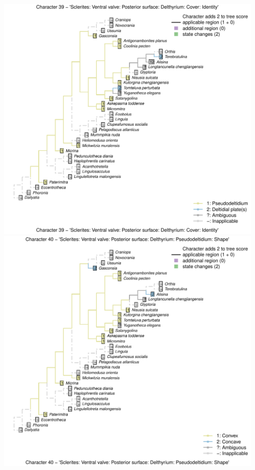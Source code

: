 \documentclass[]{book}
\theoremstyle{definition}
\theoremstyle{definition}
\theoremstyle{definition}
\theoremstyle{remark}
\begin{document}
\includegraphics{Brachiopod_phylogeny_files/figure-latex/unnamed-chunk-4-39.pdf}
\includegraphics{Brachiopod_phylogeny_files/figure-latex/unnamed-chunk-4-40.pdf}
\end{document}
